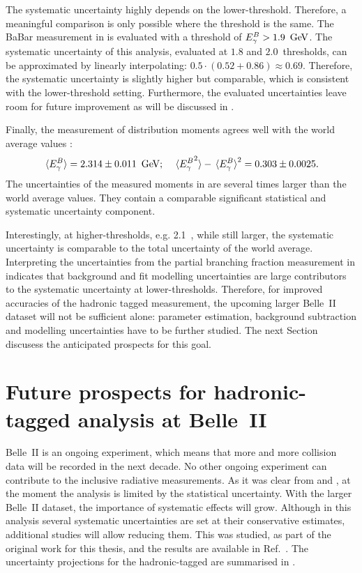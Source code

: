 The systematic uncertainty highly depends on the lower-\EB threshold.
Therefore, a meaningful comparison is only possible where the \EB threshold is the same.
The BaBar measurement in  is evaluated with a threshold of ${E^B_{\gamma}}>1.9~\mathrm{\,Ge\kern -0.1em V}$.
The systematic uncertainty of this analysis, evaluated at $1.8$ and $2.0$~\gev thresholds, can be approximated by linearly interpolating: $0.5\cdot(0.52+0.86)\approx0.69$.
Therefore, the systematic uncertainty is slightly higher but comparable, which is consistent with the lower-\EB threshold setting.
Furthermore, the evaluated uncertainties leave room for future improvement as will be discussed in .

Finally, the measurement of \EB distribution moments agrees well with the world average values \cite{Workman:2022ynf}:
\begin{equation}
    \expval**{{E^B_{\gamma}}} = 2.314 \pm 0.011 ~\mathrm{\,Ge\kern -0.1em V}; \quad \expval**{{E^B_{\gamma}}^2} - \expval**{{E^B_{\gamma}}}^2 = 0.303 \pm 0.0025.
\end{equation}
The uncertainties of the measured moments in  are several times larger than the world average values.
They contain a comparable significant statistical and systematic uncertainty component.

Interestingly, at higher-\EB thresholds, e.g. 2.1~\gev, while still larger, the systematic uncertainty is comparable to the total uncertainty of the world average.
Interpreting the uncertainties from the partial branching fraction measurement in  indicates that background and fit modelling uncertainties are large contributors to the systematic uncertainty at lower-\EB thresholds.
Therefore, for improved accuracies of the hadronic tagged measurement,
the upcoming larger Belle~II dataset will not be sufficient alone:
parameter estimation, background subtraction and modelling uncertainties have to be further studied.
The next Section discusess the anticipated prospects for this goal.

\section{Future prospects for hadronic-tagged \safeBtoXsgamma analysis at Belle~II}\label{sec:future_prospects}

Belle~II is an ongoing experiment, which means that more and more \epem collision data will be recorded in the next decade.
No other ongoing experiment can contribute to the inclusive radiative measurements.
As it was clear from  and , at the moment the analysis is limited by the statistical uncertainty.
With the larger Belle~II dataset, the importance of systematic effects will grow.
Although in this analysis several systematic uncertainties are set at their conservative estimates,
additional studies will allow reducing them.
This was studied, as part of the original work for this thesis, and the results are available in Ref.~\cite{Belle-II:2022cgf}.
The uncertainty projections for the hadronic-tagged \BtoXsgamma are summarised in .

